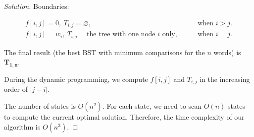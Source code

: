\documentclass{article}
\newenvironment{solution}{\begin{proof}[\noindent\it Solution]}{\end{proof}}
\begin{document}
\begin{solution}
    \hspace{1em}
    Boundaries: 
    
    \vspace{-2.5em}
    \begin{align*}
        f[i,j] = 0,\ T_{i,j}=\varnothing,\qquad &\text{when }i>j. \\
        f[i,j] = w_i,\ T_{i,j}=\text{the tree with one node $i$ only},\qquad &\text{when }i=j.
    \end{align*}
    
    \hspace{1em}
    The final result (the best BST with minimum comparisons for the $n$ words) is \underline{$\boldsymbol{T_{1,n}}$}.
    
    \vspace{1em} \hspace{1em}
    During the dynamic programming, we compute $f[i,j]$ and $T_{i,j}$ in the increasing order of $|j-i|$. 
    
    \vspace{5em} \hspace{1em}
    The number of states is $O(n^2)$. For each state, we need to scan $O(n)$ states to compute the current optimal solution. Therefore, the time complexity of our algorithm is $O(n^3)$.
\end{solution}


\vspace{1em}
\end{document}
